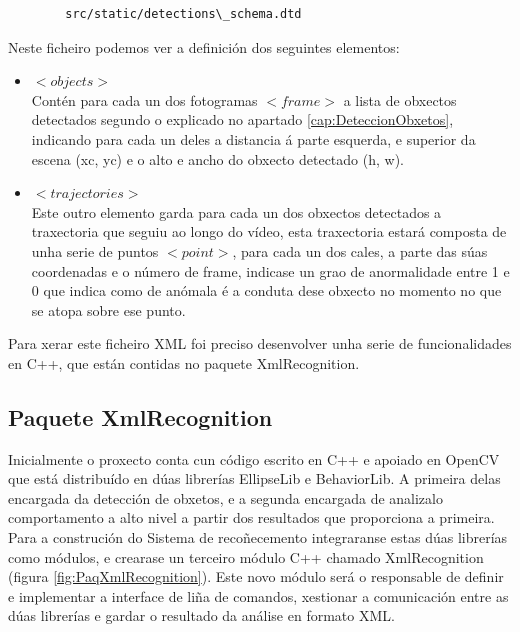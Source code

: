 		\begin{verbatim}
		src/static/detections\_schema.dtd
		\end{verbatim}		 

		Neste ficheiro podemos ver a definición dos seguintes elementos:
		\begin{itemize}
		\item{{\textbf{$<objects>$\\}}}
			Contén para cada un dos fotogramas $<frame>$ a lista de obxectos detectados segundo
			o explicado no apartado \ref{cap:DeteccionObxetos}, indicando para cada un deles a
			distancia á parte esquerda, e superior da escena (xc, yc) e o alto e ancho do obxecto
			detectado (h, w).
		\item{{\textbf{$<trajectories>$\\}}}
			Este outro elemento garda para cada un dos obxectos detectados a traxectoria que 
			seguiu ao longo do vídeo, esta traxectoria estará composta de unha serie de puntos
			$<point>$, para cada un dos cales, a parte das súas coordenadas e o número de 
			frame, indicase un grao de anormalidade entre 1 e 0 que indica como de anómala é 
			a conduta dese obxecto no momento no que se atopa sobre ese punto.
		\end{itemize}
		
		Para xerar este ficheiro XML foi preciso desenvolver unha serie de funcionalidades en C++,
		que están contidas no paquete XmlRecognition.
	
	\subsection{Paquete XmlRecognition}
		Inicialmente o proxecto conta cun código escrito en C++ e apoiado en OpenCV que está distribuído en
		dúas librerías EllipseLib e BehaviorLib. A primeira delas encargada da detección de obxetos, e a segunda
		encargada de analizalo comportamento a alto nivel a partir dos resultados que proporciona a primeira.\\
		
		Para a construción do Sistema de recoñecemento integraranse estas dúas librerías como módulos, e 
		crearase un terceiro módulo C++ chamado XmlRecognition (figura \ref{fig:PaqXmlRecognition}).
		Este novo módulo será o responsable de definir e implementar a interface de liña de 
		comandos, xestionar a comunicación entre as dúas librerías e gardar o resultado da análise
		en formato XML.
        
